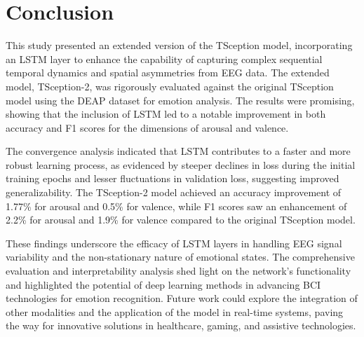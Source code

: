 \section{Conclusion}
This study presented an extended version of the TSception model, incorporating an LSTM layer to enhance the capability of capturing complex sequential temporal dynamics and spatial asymmetries from EEG data. The extended model, TSception-2, was rigorously evaluated against the original TSception model using the DEAP dataset for emotion analysis. The results were promising, showing that the inclusion of LSTM led to a notable improvement in both accuracy and F1 scores for the dimensions of arousal and valence.

The convergence analysis indicated that LSTM contributes to a faster and more robust learning process, as evidenced by steeper declines in loss during the initial training epochs and lesser fluctuations in validation loss, suggesting improved generalizability. The TSception-2 model achieved an accuracy improvement of 1.77\% for arousal and 0.5\% for valence, while F1 scores saw an enhancement of 2.2\% for arousal and 1.9\% for valence compared to the original TSception model.

These findings underscore the efficacy of LSTM layers in handling EEG signal variability and the non-stationary nature of emotional states. The comprehensive evaluation and interpretability analysis shed light on the network's functionality and highlighted the potential of deep learning methods in advancing BCI technologies for emotion recognition. Future work could explore the integration of other modalities and the application of the model in real-time systems, paving the way for innovative solutions in healthcare, gaming, and assistive technologies.
